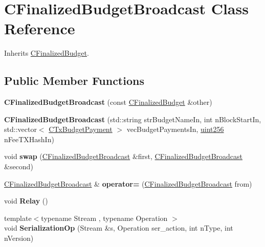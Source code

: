 \hypertarget{class_c_finalized_budget_broadcast}{}\section{C\+Finalized\+Budget\+Broadcast Class Reference}
\label{class_c_finalized_budget_broadcast}


Inherits \mbox{\hyperlink{class_c_finalized_budget}{C\+Finalized\+Budget}}.

\subsection*{Public Member Functions}
\begin{DoxyCompactItemize}
\item 
\mbox{\label{class_c_finalized_budget_broadcast_a0fc9903afc9a1ccfc7008f0bb95ba26e}} 
{\bfseries C\+Finalized\+Budget\+Broadcast} (const \mbox{\hyperlink{class_c_finalized_budget}{C\+Finalized\+Budget}} \&other)
\item 
\mbox{\label{class_c_finalized_budget_broadcast_a800780793836750ec3c848e87fb397a7}} 
{\bfseries C\+Finalized\+Budget\+Broadcast} (std\+::string str\+Budget\+Name\+In, int n\+Block\+Start\+In, std\+::vector$<$ \mbox{\hyperlink{class_c_tx_budget_payment}{C\+Tx\+Budget\+Payment}} $>$ vec\+Budget\+Payments\+In, \mbox{\hyperlink{classuint256}{uint256}} n\+Fee\+T\+X\+Hash\+In)
\item 
\mbox{\label{class_c_finalized_budget_broadcast_ac9e99f471d82a9c2d76137a758740315}} 
void {\bfseries swap} (\mbox{\hyperlink{class_c_finalized_budget_broadcast}{C\+Finalized\+Budget\+Broadcast}} \&first, \mbox{\hyperlink{class_c_finalized_budget_broadcast}{C\+Finalized\+Budget\+Broadcast}} \&second)
\item 
\mbox{\label{class_c_finalized_budget_broadcast_afccbdda2d00c695c63802db0fda2d489}} 
\mbox{\hyperlink{class_c_finalized_budget_broadcast}{C\+Finalized\+Budget\+Broadcast}} \& {\bfseries operator=} (\mbox{\hyperlink{class_c_finalized_budget_broadcast}{C\+Finalized\+Budget\+Broadcast}} from)
\item 
\mbox{\label{class_c_finalized_budget_broadcast_abb4cfac3327e7cb912b368054d23fc9c}} 
void {\bfseries Relay} ()
\item 
\mbox{\label{class_c_finalized_budget_broadcast_a2c9bac4bb653dbae4c3861fd12380dcd}} 
{\footnotesize template$<$typename Stream , typename Operation $>$ }\\void {\bfseries Serialization\+Op} (Stream \&s, Operation ser\+\_\+action, int n\+Type, int n\+Version)
\end{DoxyCompactItemize}
